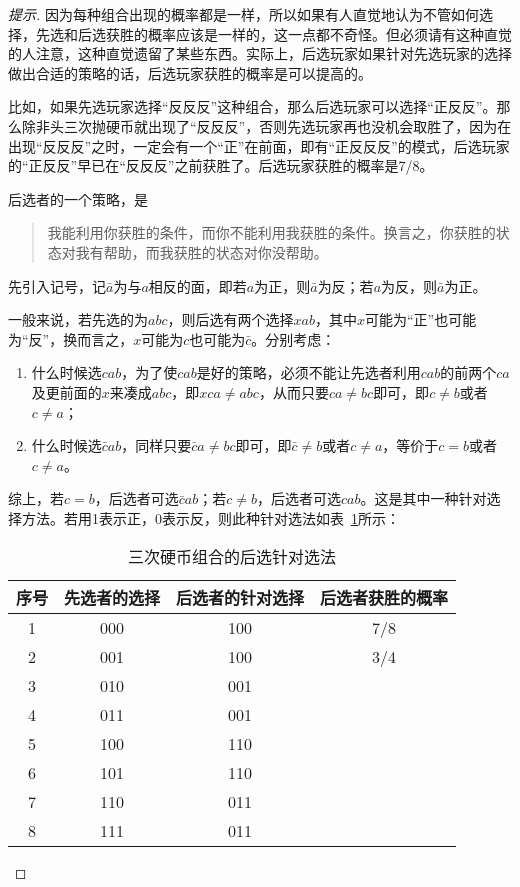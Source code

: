 \begin{proof}[提示]
  因为每种组合出现的概率都是一样，所以如果有人直觉地认为不管如何选择，先选和后选获胜的概率应该是一样的，这一点都不奇怪。但必须请有这种直觉的人注意，这种直觉遗留了某些东西。实际上，后选玩家如果针对先选玩家的选择做出合适的策略的话，后选玩家获胜的概率是可以提高的。

  比如，如果先选玩家选择“反反反”这种组合，那么后选玩家可以选择“正反反”。那么除非头三次抛硬币就出现了“反反反”，否则先选玩家再也没机会取胜了，因为在出现“反反反”之时，一定会有一个“正”在前面，即有“正反反反”的模式，后选玩家的“正反反”早已在“反反反”之前获胜了。后选玩家获胜的概率是7/8。

  后选者的一个策略，是
  \begin{quotation}
    我能利用你获胜的条件，而你不能利用我获胜的条件。换言之，你获胜的状态对我有帮助，而我获胜的状态对你没帮助。
  \end{quotation}

  先引入记号，记$\bar a$为与$a$相反的面，即若$a$为正，则$\bar a$为反；若$a$为反，则$\bar a$为正。

  一般来说，若先选的为$abc$，则后选有两个选择$xab$，其中$x$可能为“正”也可能为“反”，换而言之，$x$可能为$c$也可能为$\bar c$。分别考虑：
  \begin{enumerate}
  \item 什么时候选$cab$，为了使$cab$是好的策略，必须不能让先选者利用$cab$的前两个$ca$及更前面的$x$来凑成$abc$，即$xca\ne abc$，从而只要$ca\ne bc$即可，即$c\ne b$或者$c\ne a$；
  \item 什么时候选$\bar cab$，同样只要$\bar ca\ne bc$即可，即$\bar c\ne b$或者$c\ne a$，等价于$c=b$或者$c\ne a$。
  \end{enumerate}

  综上，若$c=b$，后选者可选$\bar cab$；若$c\ne b$，后选者可选$cab$。这是其中一种针对选择方法。若用1表示正，0表示反，则此种针对选法如表~\ref{tab:3-coins-trap-game}所示：
  \begin{table}[htbp]
    \centering
    \begin{tabular}{cccc}
      \toprule
      序号 & 先选者的选择 & 后选者的针对选择 & 后选者获胜的概率 \\\midrule
      1 & 000 & 100 & 7/8\\
      2 & 001 & 100 & 3/4\\
      3 & 010 & 001 &\\
      4 & 011 & 001 &\\
      5 & 100 & 110 &\\
      6 & 101 & 110 &\\
      7 & 110 & 011 &\\
      8 & 111 & 011 &\\
      \bottomrule
    \end{tabular}
    \caption{三次硬币组合的后选针对选法}
    \label{tab:3-coins-trap-game}
  \end{table}


\end{proof}
